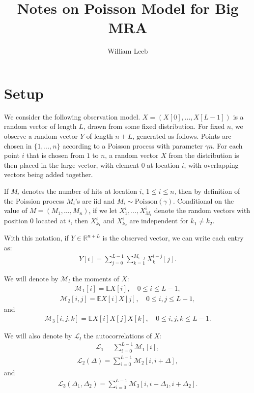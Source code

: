 \documentclass{article}
\theoremstyle{thm}
\theoremstyle{definition}
\newcommand{\R}{\mathbb{R}}
\newcommand{\E}{\mathbb{E}}
\newcommand{\1}{\mathbf{1}}
\newcommand{\Poisson}{\text{Poisson}}
\newcommand{\M}{\mathcal{M}}
\renewcommand{\L}{\mathcal{L}}
\begin{document}
\title{Notes on Poisson Model for Big MRA}
\author{William Leeb}
\date{}
\maketitle

\section{Setup}

We consider the following observation model. $X = (X[0],\dots,X[L-1])$ is a random vector of length $L$, drawn from some fixed distribution. For fixed $n$, we observe a random vector $Y$ of length $n+L$, generated as follows. Points are chosen in $\{1,\dots,n\}$ according to a Poisson process with parameter $\gamma n$. For each point $i$ that is chosen from $1$ to $n$, a random vector $X$ from the distribution is then placed in the large vector, with element $0$ at location $i$, with overlapping vectors being added together. 

If $M_i$ denotes the number of hits at location $i$, $1 \le i \le n$, then by definition of the Poission process $M_i$'s are iid and $M_i \sim \Poisson(\gamma)$. Conditional on the value of $M = (M_1,\dots,M_n)$, if we let $X_1^{i},\dots,X_{M_i}^i$ denote the random vectors with position 0 located at $i$, then $X_{k_1}^{i}$ and $X_{k_2}^{i}$ are independent for $k_1 \ne k_2$.

With this notation, if $Y \in \R^{n+L}$ is the observed vector, we can write each entry as:
%
\begin{align}
%
Y[i] = \sum_{j=0}^{L-1} \sum_{k=1}^{M_{i-j}} X_k^{i-j}[j].
%
\end{align}

We will denote by $\M_l$ the moments of $X$:
%
\begin{align}
%
\M_1[i] = \E X[i], \quad 0 \le i \le L-1,
%
\end{align}
%
\begin{align}
%
\M_2[i,j] = \E X[i] X[j], \quad 0 \le i,j \le L-1,
%
\end{align}
%
and
%
\begin{align}
%
\M_3[i,j,k] = \E X[i] X[j] X[k], \quad 0 \le i,j,k \le L-1.
%
\end{align}

We will also denote by $\L_l$ the autocorrelations of $X$:
%
\begin{align}
%
\L_1 = \sum_{i=0}^{L-1} \M_1[i],
%
\end{align}
%
\begin{align}
%
\L_2(\Delta) = \sum_{i=0}^{L-1} \M_2[i,i+\Delta],
%
\end{align}
%
and
%
\begin{align}
%
\L_3(\Delta_1,\Delta_2) = \sum_{i=0}^{L-1} \M_3[i,i+\Delta_1,i+\Delta_2].
%
\end{align}
\end{document}
